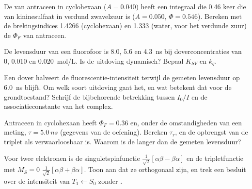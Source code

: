 \begin{exercise}[$\star\star$]\label{exo:b3:electronic-spectroscopy:8}
De  van antraceen in cyclohexaan ($A = 0.040$) heeft een
integraal die 0.46 keer die van kininesulfaat in verdund zwavelzuur is ($A = 0.050$, $\Phi =
0.546$). Bereken met de brekingsindices 1.4266 (cyclohexaan) en 1.333
(water, voor het verdunde zuur) de $\Phi_F$ van antraceen.
\end{exercise}

\begin{exercise}[$\star\star$]\label{exo:b3:electronic-spectroscopy:9}
De levensduur van een fluorofoor is 8.0, 5.6 en \qty{4.3}{ns} bij
doverconcentraties van 0, 0.010 en \qty{0.020}{mol/L}. Is de uitdoving
dynamisch? Bepaal
$K_{SV}$ en $k_q$.
\end{exercise}

\begin{exercise}[$\star\star\star$]\label{exo:b3:electronic-spectroscopy:10}
Een dover halveert de fluorescentie-intensiteit terwijl de gemeten
levensduur op \qty{6.0}{ns} blijft. Om welk soort uitdoving gaat het, en
wat betekent dat voor de grondtoestand? Schrijf de bijbehorende betrekking
tussen $I_0/I$ en de associatieconstante van het complex.
\end{exercise}

\begin{exercise}[$\star\star\star$]\label{exo:b3:electronic-spectroscopy:11}
Antraceen in cyclohexaan heeft $\Phi_F = 0.36$ en, onder de omstandigheden
van een meting, $\tau = \qty{5.0}{ns}$ (gegevens van de oefening). Bereken $\tau_r$, en de
opbrengst van de triplet als  verwaarloosbaar is. Waarom
is de  langer dan de gemeten levensduur?
\end{exercise}

\begin{exercise}[$\star\star\star$]\label{exo:b3:electronic-spectroscopy:12}
Voor twee elektronen is de singuletspinfunctie $\frac{1}{\sqrt2}[\alpha\beta - \beta\alpha]$
en de tripletfunctie met $M_S = 0$ $\frac{1}{\sqrt2}[\alpha\beta + \beta\alpha]$. Toon aan dat
ze orthogonaal zijn, en trek een besluit over de intensiteit van $T_1 \leftarrow S_0$ zonder
.
\end{exercise}

